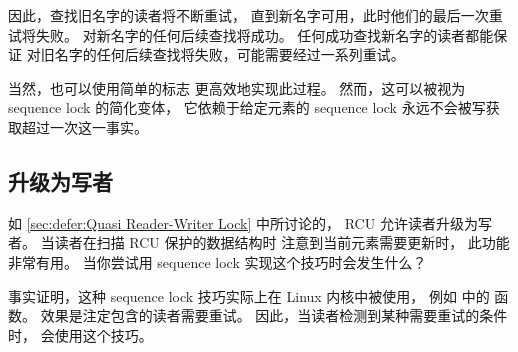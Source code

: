 因此，查找旧名字的读者将不断重试，
直到新名字可用，此时他们的最后一次重试将失败。
对新名字的任何后续查找将成功。
任何成功查找新名字的读者都能保证
对旧名字的任何后续查找将失败，可能需要经过一系列重试。


当然，也可以使用简单的标志
更高效地实现此过程。
然而，这可以被视为 sequence lock 的简化变体，
它依赖于给定元素的 sequence lock
永远不会被写获取超过一次这一事实。


\subsection{升级为写者}
\label{sec:together:Upgrade to Writer}

如 \cref{sec:defer:Quasi Reader-Writer Lock} 中所讨论的，
RCU 允许读者升级为写者。
当读者在扫描 RCU 保护的数据结构时
注意到当前元素需要更新时，
此功能非常有用。
当你尝试用 sequence lock 实现这个技巧时会发生什么？

事实证明，这种 sequence lock 技巧实际上在
Linux 内核中被使用，
例如 
中的  函数。
效果是注定包含的读者需要重试。
因此，当读者检测到某种需要重试的条件时，
会使用这个技巧。

